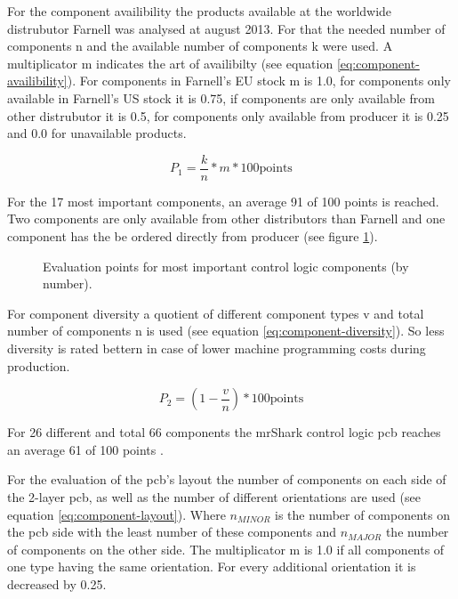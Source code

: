 \documentclass{acm_proc_article-sp}
\begin{document}
For the component availibility the products available at the worldwide
distrubutor Farnell was analysed at august 2013. For that the needed number of
components {n} and the available number of components {k} were used. A
multiplicator {m} indicates the art of availibilty (see equation
\ref{eq:component-availibility}).
For components in Farnell's EU stock {m} is 1.0, for components only available
in Farnell's US stock it is 0.75, if components are only available from other
distrubutor it is 0.5, for components only available from producer it is 0.25 and 0.0 for unavailable
products\cite{eilers:13}.

\begin{equation}
\label{eq:component-availibility}
P_{1} = \frac{k}{n}*m*100 \text{points}
\end{equation}

For the 17 most important components, an average 91 of 100 points is reached.
Two components are only available from other distributors than Farnell and one
component has the be ordered directly from producer (see figure
\ref{fig:evavailibility}).

\begin{figure}
\centering
{}
\caption{Evaluation points for most important control logic components (by
number).}
\label{fig:evavailibility}
\end{figure}

For component diversity a quotient of different component types {v} and total
number of components {n} is used (see equation \ref{eq:component-diversity}). So
less diversity is rated bettern in case of lower machine programming costs
during production.

\begin{equation}
\label{eq:component-diversity}
P_{2} = (1 - \frac{v}{n}) * 100 \text{points}
\end{equation}

For 26 different and total 66 components the mrShark control logic pcb reaches
an average 61 of 100 points \cite{eilers:13}.

For the evaluation of the pcb's layout the number of components on each side of
the 2-layer pcb, as well as the number of different orientations are used (see
equation \ref{eq:component-layout}). Where $n_{MINOR}$ is the number of components on the pcb
side with the least number of these components and $n_{MAJOR}$ the number of
components on the other side. The multiplicator {m} is 1.0 if all
components of one type having the same orientation. For every additional
orientation it is decreased by 0.25.
\end{document}
